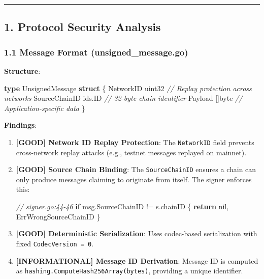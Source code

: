 \documentclass[
]{article}
\newenvironment{Shaded}{}{}
\newcommand{\CommentTok}[1]{\textcolor[rgb]{0.38,0.63,0.69}{\textit{#1}}}
\newcommand{\ControlFlowTok}[1]{\textcolor[rgb]{0.00,0.44,0.13}{\textbf{#1}}}
\newcommand{\DataTypeTok}[1]{\textcolor[rgb]{0.56,0.13,0.00}{#1}}
\newcommand{\KeywordTok}[1]{\textcolor[rgb]{0.00,0.44,0.13}{\textbf{#1}}}
\newcommand{\NormalTok}[1]{#1}
\newcommand{\OperatorTok}[1]{\textcolor[rgb]{0.40,0.40,0.40}{#1}}
\newcommand{\OtherTok}[1]{\textcolor[rgb]{0.00,0.44,0.13}{#1}}
\begin{document}
\begin{center}\rule{0.5\linewidth}{0.5pt}\end{center}

\subsection{1. Protocol Security
Analysis}\label{1-protocol-security-analysis}

\subsubsection{1.1 Message Format
(unsigned\_message.go)}\label{11-message-format-unsigned_messagego}

\textbf{Structure}:

\begin{Shaded}
\begin{Highlighting}[]
\KeywordTok{type}\NormalTok{ UnsignedMessage }\KeywordTok{struct} \OperatorTok{\{}
\NormalTok{    NetworkID     }\DataTypeTok{uint32}    \CommentTok{// Replay protection across networks}
\NormalTok{    SourceChainID ids}\OperatorTok{.}\NormalTok{ID    }\CommentTok{// 32{-}byte chain identifier}
\NormalTok{    Payload       }\OperatorTok{[]}\DataTypeTok{byte}    \CommentTok{// Application{-}specific data}
\OperatorTok{\}}
\end{Highlighting}
\end{Shaded}

\textbf{Findings}:

\begin{enumerate}
\def\labelenumi{\arabic{enumi}.}
\item
  \textbf{{[}GOOD{]} Network ID Replay Protection}: The
  \texttt{NetworkID} field prevents cross-network replay attacks (e.g.,
  testnet messages replayed on mainnet).
\item
  \textbf{{[}GOOD{]} Source Chain Binding}: The \texttt{SourceChainID}
  ensures a chain can only produce messages claiming to originate from
  itself. The signer enforces this:

\begin{Shaded}
\begin{Highlighting}[]
\CommentTok{// signer.go:44{-}46}
\ControlFlowTok{if}\NormalTok{ msg}\OperatorTok{.}\NormalTok{SourceChainID }\OperatorTok{!=}\NormalTok{ s}\OperatorTok{.}\NormalTok{chainID }\OperatorTok{\{}
    \ControlFlowTok{return} \OtherTok{nil}\OperatorTok{,}\NormalTok{ ErrWrongSourceChainID}
\OperatorTok{\}}
\end{Highlighting}
\end{Shaded}
\item
  \textbf{{[}GOOD{]} Deterministic Serialization}: Uses codec-based
  serialization with fixed \texttt{CodecVersion\ =\ 0}.
\item
  \textbf{{[}INFORMATIONAL{]} Message ID Derivation}: Message ID is
  computed as \texttt{hashing.ComputeHash256Array(bytes)}, providing a
  unique identifier.
\end{enumerate}
\end{document}
